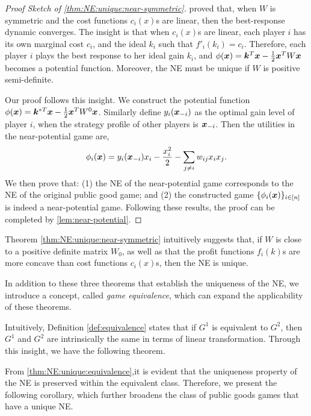 \begin{proof}[Proof Sketch of \cref{thm:NE:unique:near-symmetric}]
\citet{public-network-direct-BRD:bayer2023best} proved that, when $W$ is symmetric and the cost functions $c_i(x)$s are linear, then the best-response dynamic converges. The insight is that when $c_i(x)$s are linear, each player $i$ has its own marginal cost $c_i$, and the ideal $k_i$ such that $f'_i(k_i) = c_i$. Therefore, each player $i$ plays the best response to her ideal gain $k_i$, and $\phi({\bm{x}}) = {\bm{k}}^T {\bm{x}} - \frac{1}{2} {\bm{x}}^T W {\bm{x}}$ becomes a potential function. Moreover, the NE must be unique if $W$ is positive semi-definite.

Our proof follows this insight. We construct the potential function $\phi({\bm{x}}) = {\bm{k}}^{*T}{\bm{x}} - \frac{1}{2}{\bm{x}}^T W^0 {\bm{x}}$. Similarly define $y_i({\bm{x}}_{-i})$ as the optimal gain level of player $i$, when the strategy profile of other players is ${\bm{x}}_{-i}$. Then the utilities in the near-potential game are, 
\begin{align*}
    \phi_i({\bm{x}}) = y_i({\bm{x}}_{-i}) x_i - \frac{x_i^2}{2} - \sum_{j\ne i} w_{ij} x_i x_j.
\end{align*}
We then prove that: (1) the NE of the near-potential game corresponds to the NE of the original public good game; and (2) the constructed game $\{\phi_i({\bm{x}})\}_{i\in[n]}$ is indeed a near-potential game.
Following these results, the proof can be completed by 
\cref{lem:near-potential}.
\end{proof}

\begin{remark}
Theorem \ref{thm:NE:unique:near-symmetric} intuitively suggests that, if $W$ is close to a positive definite matrix $W_0$, as well as that the profit functions $f_i(k)$s are more concave than cost functions $c_i(x)$s, then the NE is unique.
\end{remark}

In addition to these three theorems that establish the uniqueness of the NE, we introduce a concept, called \emph{game equivalence}, which can expand the applicability of these theorems.



Intuitively, Definition \ref{def:equivalence} states that if $G^1$ is equivalent to $G^2$, then $G^1$ and $G^2$ are intrinsically the same in terms of linear transformation. Through this insight, we have the following theorem.



From \cref{thm:NE:unique:equivalence},it is evident that the uniqueness property of the NE is preserved within the equivalent class. Therefore, we present the following corollary, which further broadens the class of public goods games that have a unique NE.




